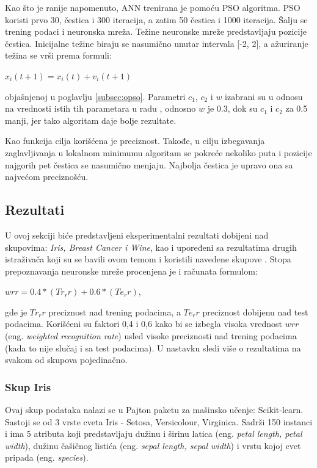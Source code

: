 \documentclass[a4paper]{article}
\begin{document}
{Kao što je ranije napomenuto, ANN trenirana je pomoću PSO algoritma. PSO koristi prvo 30, čestica i 300 iteracija, a zatim 50 čestica i 1000 iteracija. Šalju se trening podaci i neuronska mreža. Težine neuronske mreže predstavljaju pozicije čestica. Inicijalne težine biraju se nasumično unutar intervala [-2, 2], a ažuriranje težina se vrši prema formuli: 
\begin{center}
{$x_i(t+1) = x_i(t) + v_i(t+1)$}
\end{center}
objašnjenoj u poglavlju \ref{subsec:opso}. Parametri $c_1$, $c_2$ i $w$ izabrani su u odnosu na vrednosti istih tih parametara u radu \cite{hindawi},
odnosno $w$ je 0.3, dok su $c_1$ i $c_2$ za 0.5 manji, jer tako algoritam daje bolje rezultate. 

Kao funkcija cilja korišćena je preciznost. Takođe, u cilju izbegavanja zaglavljivanja u lokalnom minimumu algoritam se pokreće nekoliko puta i pozicije najgorih pet čestica se nasumično menjaju. Najbolja čestica je upravo ona sa najvećom preciznošću.

\subsection{Rezultati}
\label{rezultati}

U ovoj sekciji biće predstavljeni eksperimentalni rezultati dobijeni nad skupovima: \textit{Iris, Breast Cancer i Wine}, kao i upoređeni sa rezultatima drugih istraživača koji su se bavili ovom temom i koristili navedene skupove \cite{hindawi}. Stopa prepoznavanja neuronske mreže procenjena je i računata formulom:
\begin{center}
{$wrr = 0.4*(Tr_r r) + 0.6*(Te_r r)$}, 
\end{center}
gde je $Tr_r r$ preciznost nad trening podacima, a $Te_r r$ preciznost dobijenu nad test podacima. Korišćeni su faktori 0,4 i 0,6 kako bi se izbegla visoka vrednost $wrr$ (eng. \emph{weighted recognition rate}) usled visoke preciznosti nad trening podacima (kada to nije slučaj i sa test podacima). U nastavku sledi više o rezultatima na svakom od skupova pojedinačno.

\subsubsection{Skup Iris}
\label{iris}

Ovaj skup podataka nalazi se u Pajton paketu za mašinsko učenje: Scikit-learn. Sastoji se od 3 vrste cveta Iris - Setosa, Versicolour, Virginica. Sadrži 150 instanci i ima 5 atributa koji predstavljaju dužinu i širinu latica (eng. \emph{petal length, petal width}), dužinu čašičnog listića 
(eng. \emph{sepal length, sepal width}) i vrstu kojoj cvet pripada (eng. \emph{species}). 

}
\end{document}
